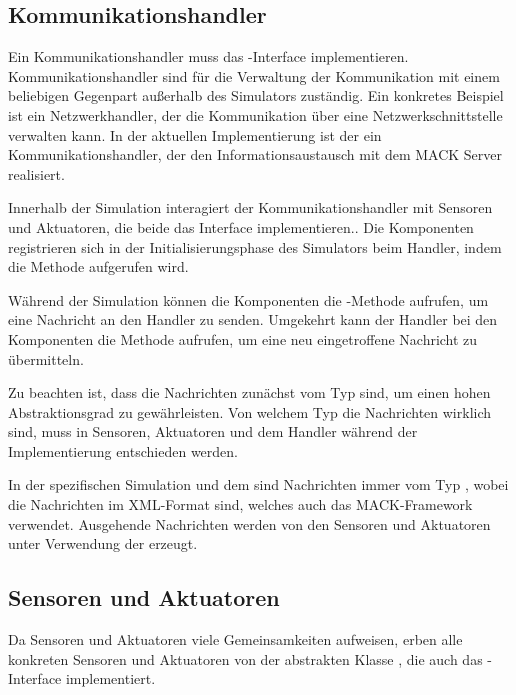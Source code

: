 \subsection{Kommunikationshandler}\label{subsec:concept_communication}
Ein Kommunikationshandler muss das -Interface implementieren.\\ Kommunikationshandler sind für die Verwaltung der Kommunikation mit einem beliebigen Gegenpart außerhalb des Simulators zuständig. Ein konkretes Beispiel ist ein Netzwerkhandler, der die Kommunikation über eine Netzwerkschnittstelle verwalten kann. In der aktuellen Implementierung ist der  ein Kommunikationshandler, der den Informationsaustausch mit dem MACK Server realisiert.

Innerhalb der Simulation interagiert der Kommunikationshandler mit Sensoren und Aktuatoren, die beide das Interface  implementieren.. Die Komponenten registrieren sich in der Initialisierungsphase des Simulators beim Handler, indem die Methode  aufgerufen wird.

Während der Simulation können die Komponenten die -Methode aufrufen, um eine Nachricht an den Handler zu senden. Umgekehrt kann der Handler bei den Komponenten die Methode  aufrufen, um eine neu eingetroffene Nachricht zu übermitteln.

Zu beachten ist, dass die Nachrichten zunächst vom Typ  sind, um einen hohen Abstraktionsgrad zu gewährleisten. Von welchem Typ die Nachrichten wirklich sind, muss in Sensoren, Aktuatoren und dem Handler während der Implementierung entschieden werden.

In der spezifischen Simulation und dem  sind Nachrichten immer vom Typ , wobei die Nachrichten im XML-Format sind, welches auch das MACK-Framework verwendet. Ausgehende Nachrichten werden von den Sensoren und Aktuatoren unter Verwendung der  erzeugt.


\subsection{Sensoren und Aktuatoren}\label{subsec:concept_actuators_sensors}
Da Sensoren und Aktuatoren viele Gemeinsamkeiten aufweisen, erben alle konkreten Sensoren und Aktuatoren von der abstrakten Klasse , die auch das -Interface implementiert.

